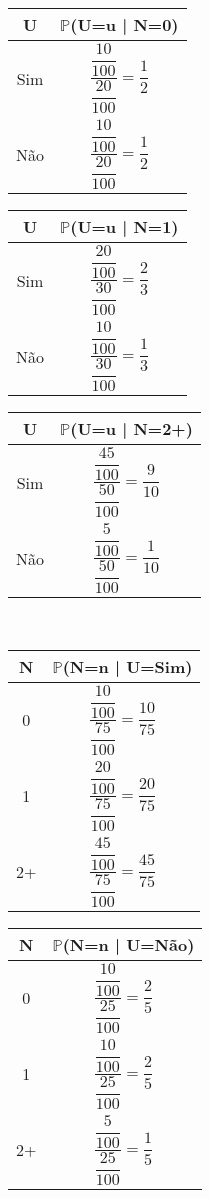 \documentclass[12pt,a4paper,draft]{article}
\begin{document}
	\begin{center}
		\begin{tabular}{cc} \midrule
			U & $\mathbb{P}$(U=u | N=0)\\ \midrule
			Sim & $\dfrac{\dfrac{10}{100}}{\dfrac{20}{100}} = \dfrac{1}{2}$\\ \midrule
			Não & $\dfrac{\dfrac{10}{100}}{\dfrac{20}{100}} = \dfrac{1}{2}$\\ \midrule
		\end{tabular}
		\hspace{1cm}
		\begin{tabular}{cc} \midrule
			U & $\mathbb{P}$(U=u | N=1)\\ \midrule
			Sim & $\dfrac{\dfrac{20}{100}}{\dfrac{30}{100}} = \dfrac{2}{3}$\\ \midrule
			Não & $\dfrac{\dfrac{10}{100}}{\dfrac{30}{100}} = \dfrac{1}{3}$\\ \midrule
		\end{tabular}
		\hspace{1cm}
		\begin{tabular}{cc} \midrule
			U & $\mathbb{P}$(U=u | N=2+)\\ \midrule
			Sim & $\dfrac{\dfrac{45}{100}}{\dfrac{50}{100}} = \dfrac{9}{10}$\\ \midrule
			Não & $\dfrac{\dfrac{5}{100}}{\dfrac{50}{100}} = \dfrac{1}{10}$\\ \midrule
		\end{tabular}
		\vspace{1cm}\\
		\begin{tabular}{cc} \midrule
			N & $\mathbb{P}$(N=n | U=Sim)\\ \midrule
			0 & $\dfrac{\dfrac{10}{100}}{\dfrac{75}{100}} = \dfrac{10}{75}$\\ \midrule
			1 & $\dfrac{\dfrac{20}{100}}{\dfrac{75}{100}} = \dfrac{20}{75}$\\ \midrule
			2+ & $\dfrac{\dfrac{45}{100}}{\dfrac{75}{100}} = \dfrac{45}{75}$\\ \midrule
		\end{tabular}
		\hspace{1cm}
		\begin{tabular}{cc} \midrule
			N & $\mathbb{P}$(N=n | U=Não)\\ \midrule
			0 & $\dfrac{\dfrac{10}{100}}{\dfrac{25}{100}} = \dfrac{2}{5}$\\ \midrule
			1 & $\dfrac{\dfrac{10}{100}}{\dfrac{25}{100}} = \dfrac{2}{5}$\\ \midrule
			2+ & $\dfrac{\dfrac{5}{100}}{\dfrac{25}{100}} = \dfrac{1}{5}$\\ \midrule
		\end{tabular}		
	\end{center}
\end{document}
